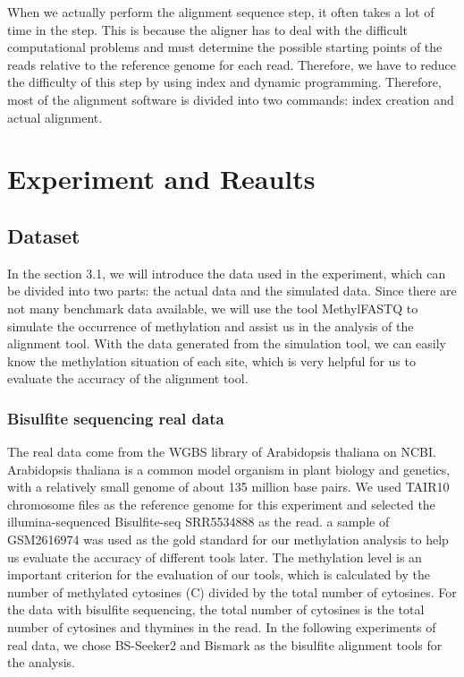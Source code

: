 \documentclass{PHlab-thesis}
\begin{document}
\par
When we actually perform the alignment sequence step, it often takes a lot of time in the step. This is because the aligner has to deal with the difficult computational problems and must determine the possible starting points of the reads relative to the reference genome for each read. Therefore, we have to reduce the difficulty of this step by using index and dynamic programming. Therefore, most of the alignment software is divided into two commands: index creation and actual alignment.

\chapter{Experiment and Reaults}
\section{Dataset}
In the section 3.1, we will introduce the data used in the experiment, which can be divided into two parts: the actual data and the simulated data. Since there are not many benchmark data available, we will use the tool MethylFASTQ to simulate the occurrence of methylation and assist us in the analysis of the alignment tool. With the data generated from the simulation tool, we can easily know the methylation situation of each site, which is very helpful for us to evaluate the accuracy of the alignment tool.

\subsection{Bisulfite sequencing real data}
The real data come from the WGBS library of Arabidopsis thaliana on NCBI. Arabidopsis thaliana is a common model organism in plant biology and genetics, with a relatively small genome of about 135 million base pairs. We used TAIR10 chromosome files as the reference genome for this experiment and selected the illumina-sequenced Bisulfite-seq SRR5534888 as the read. a sample of GSM2616974 was used as the gold standard for our methylation analysis to help us evaluate the accuracy of different tools later. The methylation level is an important criterion for the evaluation of our tools, which is calculated by the number of methylated cytosines (C) divided by the total number of cytosines. For the data with bisulfite sequencing, the total number of cytosines is the total number of cytosines and thymines in the read. In the following experiments of real data, we chose BS-Seeker2 and Bismark as the bisulfite alignment tools for the analysis.
\end{document}

